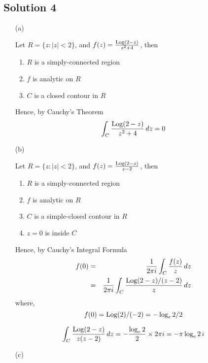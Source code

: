 \subsection*{Solution 4}

\begin{itemize}
\item[(a)]

Let $R=\{ z: |z|<2 \}$, and $f(z)=\frac{{\rm Log}(2-z)}{z^2+4}$, then
\begin{enumerate}
\item $R$ is a simply-connected region
\item $f$ is analytic on $R$
\item $C$ is a closed contour in $R$
\end{enumerate}
Hence, by Cauchy's Theorem
\[
\int_C \frac{{\rm Log}(2-z)}{z^2+4}\,dz = 0
\]

\item[(b)]

Let $R=\{ z: |z|<2 \}$, and $f(z)=\frac{{\rm Log}(2-z)}{z-2}$, then
\begin{enumerate}
\item $R$ is a simply-connected region
\item $f$ is analytic on $R$
\item $C$ is a simple-closed contour in $R$
\item $z=0$ is inside $C$
\end{enumerate}
Hence, by Cauchy's Integral Formula 
\begin{eqnarray*}
f(0)	&=& \frac{1}{2\pi i} \int_C \frac{f(z)}{z}\, dz \\
	&=& \frac{1}{2\pi i} \int_C \frac{{\rm Log}(2-z)/(z-2)}{z}\, dz \\
\end{eqnarray*}
where,
\[ f(0) = {\rm Log}(2)/(-2) = -\log_e 2/2 \]

\[
\int_C \frac{{\rm Log}(2-z)}{z(z-2)}\,dz = -\frac{\log_e 2}{2}\times2\pi i = -\pi\log_e 2\,i
\]

\item[(c)]


\end{itemize}
